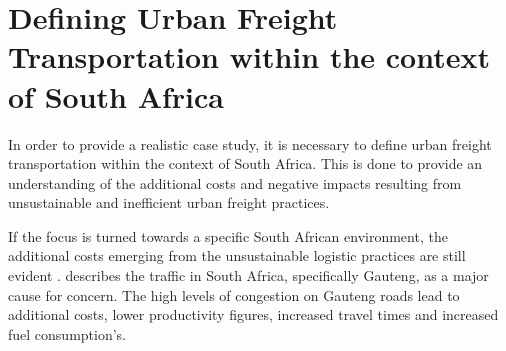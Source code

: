 \label{chapter 5}

\section{Defining Urban Freight Transportation within the context of South Africa}
In order to provide a realistic case study, it is necessary to define urban freight transportation within the context of South Africa. This is done to provide an understanding of the additional costs and negative impacts resulting from unsustainable and inefficient urban freight practices.\par

If the focus is turned towards a specific South African environment, the additional costs emerging from the unsustainable logistic practices are still evident . \citet{markman2003gauteng} describes the traffic in South Africa, specifically Gauteng, as a major cause for concern. The high levels of congestion on Gauteng roads lead to additional costs, lower productivity figures, increased travel times and increased fuel consumption's.\par


